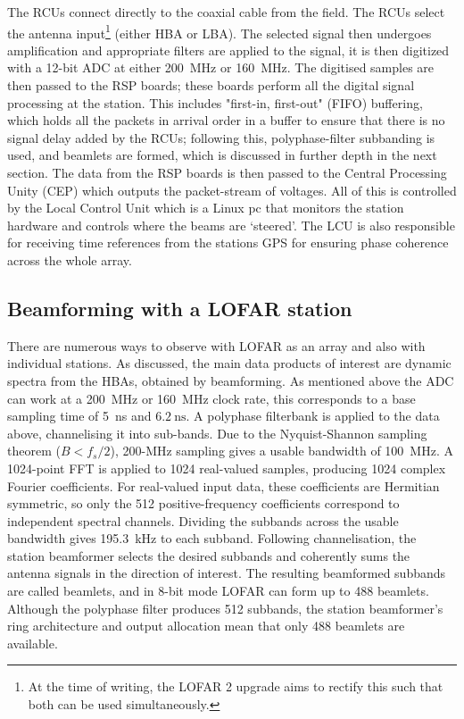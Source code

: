 The RCUs connect directly to the coaxial cable from the field. The RCUs select the antenna input\footnote{At the time of writing, the LOFAR 2 upgrade aims to rectify this such that both can be used simultaneously.} (either HBA or LBA). The selected signal then undergoes amplification and appropriate filters are applied to the signal, it is then digitized with a 12-bit ADC at either 200~MHz or 160~MHz. 
The digitised samples are then passed to the RSP boards; these boards perform all the digital signal processing at the station. This includes "first-in, first-out" (FIFO) buffering, which holds all the packets in arrival order in a buffer to ensure that there is no signal delay added by the RCUs; following this, polyphase-filter subbanding is used, and beamlets are formed, which is discussed in further depth in the next section. The data from the RSP boards is then passed to the Central Processing Unity (CEP) which outputs the packet-stream of voltages. All of this is controlled by the Local Control Unit which is a Linux pc that monitors the station hardware and controls where the beams are `steered'. The LCU is also responsible for receiving time references from the stations GPS for ensuring phase coherence across the whole array.  

\subsection{Beamforming with a LOFAR station}

There are numerous ways to observe with LOFAR as an array and also with individual stations. As discussed, the main data products of interest are dynamic spectra from the HBAs, obtained by beamforming. As mentioned above the ADC can work at a 200~MHz or 160~MHz clock rate, this corresponds to a base sampling time of 5~ns and $6.2~ \text{ns}$. A polyphase filterbank is applied to the data above, channelising it into sub-bands. Due to the Nyquist-Shannon sampling theorem ($B < f_s/2$), 200-MHz sampling gives a usable bandwidth of 100~MHz. A 1024-point FFT is applied to 1024 real-valued samples, producing 1024 complex Fourier coefficients. For real-valued input data, these coefficients are Hermitian symmetric, so only the 512 positive-frequency coefficients correspond to independent spectral channels. Dividing the subbands across the usable bandwidth gives 195.3~kHz to each subband. Following channelisation, the station beamformer selects the desired subbands and coherently sums the antenna signals in the direction of interest. The resulting beamformed subbands are called beamlets, and in 8-bit mode LOFAR can form up to 488 beamlets. Although the polyphase filter produces 512 subbands, the station beamformer's ring architecture and output allocation mean that only 488 beamlets are available. 

